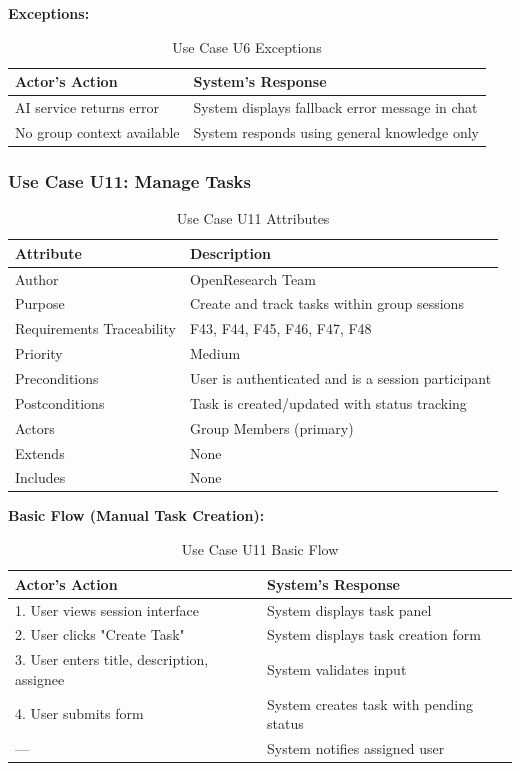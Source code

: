 \documentclass[11pt,a4paper]{article}
\begin{document}
\textbf{Exceptions:}

\begin{table}[H]
\centering
\begin{tabular}{p{6cm}p{7cm}}
\toprule
\textbf{Actor's Action} & \textbf{System's Response} \\
\midrule
AI service returns error & System displays fallback error message in chat \\
No group context available & System responds using general knowledge only \\
\bottomrule
\end{tabular}
\caption{Use Case U6 Exceptions}
\end{table}

\subsubsection{Use Case U11: Manage Tasks}

\begin{table}[H]
\centering
\begin{tabular}{p{4cm}p{9cm}}
\toprule
\textbf{Attribute} & \textbf{Description} \\
\midrule
Author & OpenResearch Team \\
Purpose & Create and track tasks within group sessions \\
Requirements Traceability & F43, F44, F45, F46, F47, F48 \\
Priority & Medium \\
Preconditions & User is authenticated and is a session participant \\
Postconditions & Task is created/updated with status tracking \\
Actors & Group Members (primary) \\
Extends & None \\
Includes & None \\
\bottomrule
\end{tabular}
\caption{Use Case U11 Attributes}
\end{table}

\textbf{Basic Flow (Manual Task Creation):}

\begin{table}[H]
\centering
\begin{tabular}{p{6cm}p{7cm}}
\toprule
\textbf{Actor's Action} & \textbf{System's Response} \\
\midrule
1. User views session interface & System displays task panel \\
2. User clicks "Create Task" & System displays task creation form \\
3. User enters title, description, assignee & System validates input \\
4. User submits form & System creates task with pending status \\
--- & System notifies assigned user \\
\bottomrule
\end{tabular}
\caption{Use Case U11 Basic Flow}
\end{table}
\end{document}
